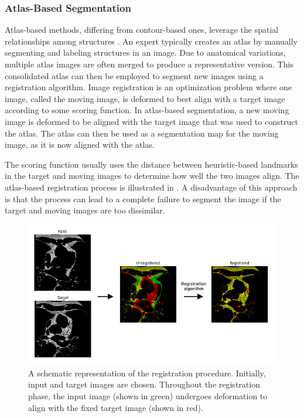 \subsubsection{Atlas-Based Segmentation}

Atlas-based methods, differing from contour-based ones, leverage the spatial relationships among structures \citep{Rohlfing2005}. An expert typically creates an atlas by manually segmenting and labeling structures in an image. Due to anatomical variations, multiple atlas images are often merged to produce a representative version. This consolidated atlas can then be employed to segment new images using a registration algorithm. Image registration is an optimization problem where one image, called the moving image, is deformed to best align with a target image according to some scoring function. In atlas-based segmentation, a new moving image is deformed to be aligned with the target image that was used to construct the atlas. The atlas can then be used as a segmentation map for the moving image, as it is now aligned with the atlas. 

The scoring function usually uses the distance between heuristic-based landmarks in the target and moving images to determine how well the two images align. The atlas-based registration process is illustrated in . A disadvantage of this approach is that the process can lead to a complete failure to segment the image if the target and moving images are too dissimilar.

\begin{figure}[h]
 \centering
 \includegraphics[width=0.7\linewidth]{images/registration.png}
 \caption{A schematic representation of the registration procedure. Initially, input and target images are chosen. Throughout the registration phase, the input image (shown in green) undergoes deformation to align with the fixed target image (shown in red). \cite{bencevicRecentProgressEpicardial2022}}
 \label{fig:registration}
 \end{figure}

